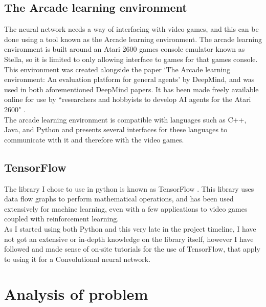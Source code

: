 \documentclass[10pt]{article}
\begin{document}
	\medskip
	
	\subsection{The Arcade learning environment}
	
		The neural network needs a way of interfacing with video games, and this can be done using a tool known as the Arcade learning environment. The arcade learning environment is built around an Atari 2600 games console emulator known as Stella, so it is limited to only allowing interface to games for that games console. This environment was created alongside the paper `The Arcade learning environment: An evaluation platform for general agents' \cite{ale} by DeepMind, and was used in both aforementioned DeepMind papers. It has been made freely available online for use by ``researchers and hobbyists to develop AI agents for the Atari 2600" \cite{ale}.\\
		
		The arcade learning environment is compatible with languages such as C++, Java, and Python and presents several interfaces for these languages to communicate with it and therefore with the video games.
			
	\medskip
	
	\subsection{TensorFlow}
		The library I chose to use in python is known as TensorFlow \cite{tensor}. This library uses data flow graphs to perform mathematical operations, and has been used extensively for machine learning, even with a few applications to video games coupled with reinforcement learning.\\
		
		As I started using both Python and this very late in the project timeline, I have not got an extensive or in-depth knowledge on the library itself, however I have followed and made sense of on-site tutorials for the use of TensorFlow, that apply to using it for a Convolutional neural network.
	
	\bigskip

\section{Analysis of problem}
	
\end{document}
